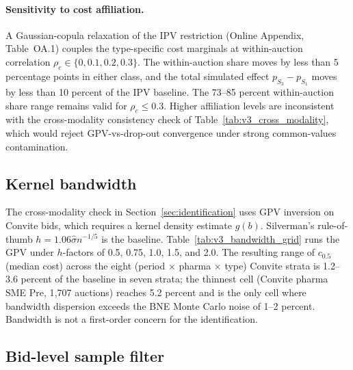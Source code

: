 \paragraph{Sensitivity to cost affiliation.} A Gaussian-copula relaxation of the IPV restriction (Online Appendix, Table~OA.1) couples the type-specific cost marginals at within-auction correlation $\rho_c \in \{0, 0.1, 0.2, 0.3\}$. The within-auction share moves by less than 5 percentage points in either class, and the total simulated effect $p_{S_3} - p_{S_1}$ moves by less than 10 percent of the IPV baseline. The 73--85 percent within-auction share range remains valid for $\rho_c \le 0.3$. Higher affiliation levels are inconsistent with the cross-modality consistency check of Table~\ref{tab:v3_cross_modality}, which would reject GPV-vs-drop-out convergence under strong common-values contamination.

\subsection{Kernel bandwidth}

The cross-modality check in Section~\ref{sec:identification} uses GPV inversion on Convite bids, which requires a kernel density estimate $g(b)$. Silverman's rule-of-thumb $h = 1.06 \hat\sigma n^{-1/5}$ is the baseline. Table~\ref{tab:v3_bandwidth_grid} runs the GPV under $h$-factors of 0.5, 0.75, 1.0, 1.5, and 2.0. The resulting range of $c_{0.5}$ (median cost) across the eight (period $\times$ pharma $\times$ type) Convite strata is 1.2--3.6 percent of the baseline in seven strata; the thinnest cell (Convite pharma SME Pre, 1{,}707 auctions) reaches 5.2 percent and is the only cell where bandwidth dispersion exceeds the BNE Monte Carlo noise of 1--2 percent. Bandwidth is not a first-order concern for the identification.

\subsection{Bid-level sample filter}

